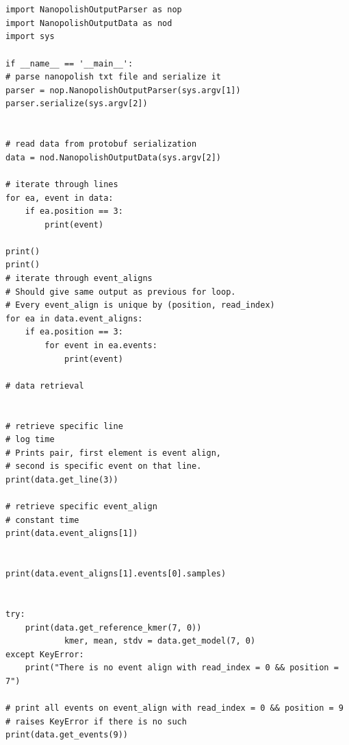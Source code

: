 \documentclass[times, utf, seminar]{fer}
\begin{document}
\begin{lstlisting}


import NanopolishOutputParser as nop
import NanopolishOutputData as nod
import sys

if __name__ == '__main__':
# parse nanopolish txt file and serialize it
parser = nop.NanopolishOutputParser(sys.argv[1])
parser.serialize(sys.argv[2])


# read data from protobuf serialization
data = nod.NanopolishOutputData(sys.argv[2])

# iterate through lines
for ea, event in data:
	if ea.position == 3:
		print(event)

print()
print()
# iterate through event_aligns
# Should give same output as previous for loop.
# Every event_align is unique by (position, read_index)
for ea in data.event_aligns:
	if ea.position == 3:
		for event in ea.events:
			print(event)

# data retrieval


# retrieve specific line
# log time
# Prints pair, first element is event align,
# second is specific event on that line.
print(data.get_line(3))

# retrieve specific event_align
# constant time
print(data.event_aligns[1])


print(data.event_aligns[1].events[0].samples)


try:
	print(data.get_reference_kmer(7, 0))
			kmer, mean, stdv = data.get_model(7, 0)
except KeyError:
	print("There is no event align with read_index = 0 && position = 7")

# print all events on event_align with read_index = 0 && position = 9
# raises KeyError if there is no such
print(data.get_events(9))
\end{lstlisting}
\end{document}
